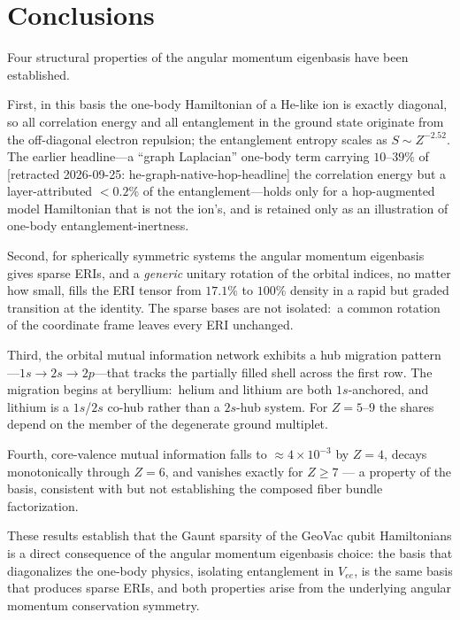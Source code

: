 \documentclass[twocolumn,pra,amsmath,amssymb,superscriptaddress]{revtex4-2}
\begin{document}
\section{Conclusions}
\label{sec:conclusions}

Four structural properties of the angular momentum eigenbasis
have been established.

First, in this basis the one-body Hamiltonian of a He-like ion is
exactly diagonal, so all correlation energy and all entanglement in the
ground state originate from the off-diagonal electron repulsion; the
entanglement entropy scales as $S \sim Z^{-2.52}$.  The earlier
headline---a ``graph Laplacian'' one-body term carrying $10$--$39\%$ of [retracted 2026-09-25: he-graph-native-hop-headline]
the correlation energy but a layer-attributed $< 0.2\%$ of the
entanglement---holds only
for a hop-augmented model Hamiltonian that is not the ion's, and is
retained only as an illustration of one-body entanglement-inertness.

Second, for spherically symmetric systems the angular momentum
eigenbasis gives sparse ERIs, and a \emph{generic} unitary rotation of
the orbital indices, no matter how small, fills the ERI tensor from
$17.1\%$ to $100\%$ density in a rapid but graded transition at the
identity.  The sparse bases are not isolated:\ a common rotation of the
coordinate frame leaves every ERI unchanged.

Third, the orbital mutual information network exhibits a hub
migration pattern---$1s \to 2s \to 2p$---that tracks the
partially filled shell across the first row.  The migration begins at
beryllium:\ helium and lithium are both $1s$-anchored, and lithium is
a $1s$/$2s$ co-hub rather than a $2s$-hub system.  For $Z = 5$--$9$
the shares depend on the member of the degenerate ground multiplet.

Fourth, core-valence mutual information falls to
$\approx 4\times10^{-3}$ by $Z = 4$, decays monotonically through
$Z = 6$, and vanishes exactly for $Z \geq 7$ --- a property of the
basis, consistent with but not establishing the composed fiber bundle
factorization.

These results establish that the Gaunt sparsity of
the GeoVac qubit Hamiltonians is a direct consequence of the
angular momentum eigenbasis choice: the basis that diagonalizes
the one-body physics, isolating entanglement in $V_{ee}$, is the same basis
that produces sparse ERIs, and both properties arise from the
underlying angular momentum conservation symmetry.
\end{document}
